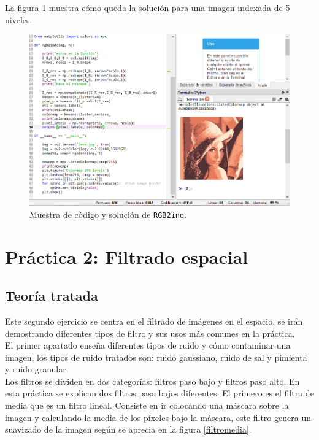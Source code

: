 \documentclass[a4paper,12pt]{report}
\begin{document}
La figura \ref{rgb2ind} muestra cómo queda la solución para una imagen indexada de 5 niveles.

\begin{figure}[h]
\centering
\includegraphics[width=1\textwidth]{imagenes/rgb2ind}
\caption{Muestra de código y solución de \texttt{RGB2ind}.}
\label{rgb2ind}
\end{figure}


\section{ Práctica 2: Filtrado espacial}

\subsection{Teoría tratada}

Este segundo ejercicio se centra en el filtrado de imágenes en el espacio, se irán demostrando diferentes tipos de filtro y sus usos más comunes en la práctica.\\

El primer apartado enseña diferentes tipos de ruido y cómo contaminar una imagen, los tipos de ruido tratados son: ruido gaussiano, ruido de sal y pimienta y ruido granular.\\

Los filtros se dividen en dos categorías: filtros paso bajo y filtros paso alto. En esta práctica se explican dos filtros paso bajos diferentes. El primero es el filtro de media que es un filtro lineal. Consiste en ir colocando una máscara sobre la imagen y calculando la media de los píxeles bajo la máscara, este filtro genera un suavizado de la imagen según se aprecia en la figura \ref{filtromedia}.
\end{document}
